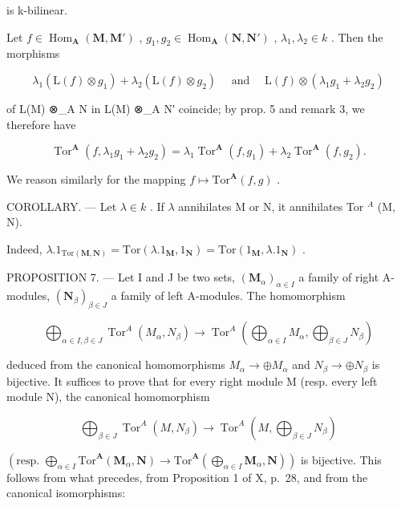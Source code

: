 is k-bilinear.

Let \(f \in \operatorname{Hom}_{\mathbf{A}}(\mathbf{M}, \mathbf{M}')\) , \(g_1, g_2 \in \operatorname{Hom}_{\mathbf{A}}(\mathbf{N}, \mathbf{N}')\) , \(\lambda_1, \lambda_2 \in k\) . Then the morphisms

\[
\lambda_ {1} (\mathrm{L} (f) \otimes g _ {1}) + \lambda_ {2} (\mathrm{L} (f) \otimes g _ {2}) \quad \text { and } \quad \mathrm{L} (f) \otimes (\lambda_ {1} g _ {1} + \lambda_ {2} g _ {2})
\]

of L(M) ⊗\_A N in L(M) ⊗\_A N′ coincide; by prop. 5 and remark 3, we therefore have

\[
\operatorname{Tor} ^ {\mathbf {A}} \left(f, \lambda_ {1} g _ {1} + \lambda_ {2} g _ {2}\right) = \lambda_ {1} \operatorname{Tor} ^ {\mathbf {A}} \left(f, g _ {1}\right) + \lambda_ {2} \operatorname{Tor} ^ {\mathbf {A}} \left(f, g _ {2}\right).\tag{10}
\]

We reason similarly for the mapping \(f\mapsto\mathrm{Tor}^{\mathbf{A}}(f,g)\) .

COROLLARY. --- Let \(\lambda\in k\) . If \(\lambda\) annihilates M or N, it annihilates Tor \(^{A}\) (M, N).

Indeed, \(\lambda .1_{\mathrm{Tor}(\mathbf{M},\mathbf{N})} = \mathrm{Tor}(\lambda .1_{\mathbf{M}},1_{\mathbf{N}}) = \mathrm{Tor}(1_{\mathbf{M}},\lambda .1_{\mathbf{N}})\) .

PROPOSITION 7. --- Let I and J be two sets, \((\mathbf{M}_{\alpha})_{\alpha \in I}\) a family of right A-modules, \((\mathbf{N}_{\beta})_{\beta \in J}\) a family of left A-modules. The homomorphism

\[
\bigoplus_ {\alpha \in I, \beta \in J} \operatorname{Tor} ^ {A} \left(M _ {\alpha}, N _ {\beta}\right)\rightarrow \operatorname{Tor} ^ {A} \left(\bigoplus_ {\alpha \in I} M _ {\alpha}, \bigoplus_ {\beta \in J} N _ {\beta}\right)
\]

deduced from the canonical homomorphisms \(M_{\alpha} \rightarrow \oplus M_{\alpha}\) and \(N_{\beta} \rightarrow \oplus N_{\beta}\) is bijective. It suffices to prove that for every right module M (resp. every left module N), the canonical homomorphism

\[
\bigoplus_ {\beta \in J} \operatorname{Tor} ^ {A} (M, N _ {\beta}) \rightarrow \operatorname{Tor} ^ {A} (M, \bigoplus_ {\beta \in J} N _ {\beta})
\]

\((\text{resp. } \bigoplus_{\alpha \in I} \text{Tor}^{\mathbf{A}}(\mathbf{M}_{\alpha}, \mathbf{N}) \to \text{Tor}^{\mathbf{A}} (\bigoplus_{\alpha \in I} \mathbf{M}_{\alpha}, \mathbf{N}))\) is bijective. This follows from what precedes, from Proposition 1 of X, p.~28, and from the canonical isomorphisms:

